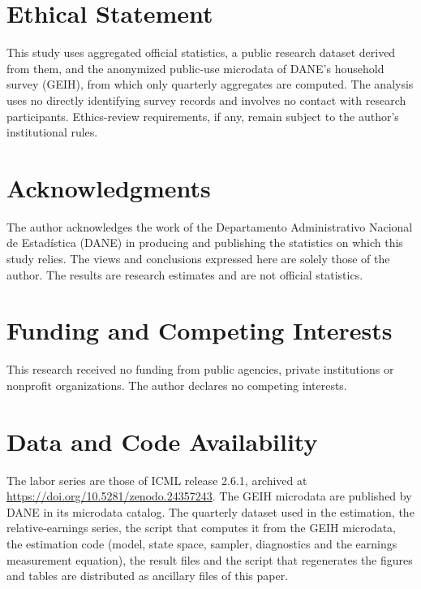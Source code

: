\section*{Ethical Statement}

This study uses aggregated official statistics, a public research dataset derived from them, and the anonymized public-use microdata of DANE's household survey (GEIH), from which only quarterly aggregates are computed. The analysis uses no directly identifying survey records and involves no contact with research participants. Ethics-review requirements, if any, remain subject to the author's institutional rules.

\section*{Acknowledgments}

The author acknowledges the work of the Departamento Administrativo Nacional de Estad\'istica (DANE) in producing and publishing the statistics on which this study relies. The views and conclusions expressed here are solely those of the author. The results are research estimates and are not official statistics.

\section*{Funding and Competing Interests}

This research received no funding from public agencies, private institutions or nonprofit organizations. The author declares no competing interests.

\section*{Data and Code Availability}

The labor series are those of ICML release 2.6.1, archived at \url{https://doi.org/10.5281/zenodo.24357243}. The GEIH microdata are published by DANE in its microdata catalog. The quarterly dataset used in the estimation, the relative-earnings series, the script that computes it from the GEIH microdata, the estimation code (model, state space, sampler, diagnostics and the earnings measurement equation), the result files and the script that regenerates the figures and tables are distributed as ancillary files of this paper.
